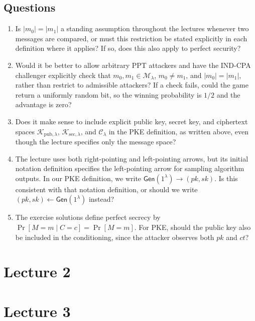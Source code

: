 \documentclass[12pt,a4paper]{article}
\begin{document}
\subsection*{Questions}
\begin{enumerate}
\item Is $|m_0|=|m_1|$ a standing assumption throughout the lectures
whenever two messages are compared, or must this restriction be stated
explicitly in each definition where it applies?
If so, does this also apply to perfect security?
\item Would it be better to allow arbitrary PPT attackers and have the
IND-CPA challenger explicitly check that $m_0,m_1\in\mathcal{M}_\lambda$,
$m_0\ne m_1$, and $|m_0|=|m_1|$, rather than restrict to admissible
attackers? If a check fails, could the game return a uniformly random
bit, so the winning probability is $1/2$ and the advantage is zero?
\item Does it make sense to include explicit public key, secret key,
and ciphertext spaces
$\mathcal{K}_{\mathrm{pub},\lambda}$,
$\mathcal{K}_{\mathrm{sec},\lambda}$, and $\mathcal{C}_\lambda$
in the PKE definition, as written above, even though the lecture
specifies only the message space?
\item The lecture uses both right-pointing and left-pointing arrows,
but its initial notation definition specifies the left-pointing arrow
for sampling algorithm outputs. In our PKE definition, we write
$\mathsf{Gen}(1^\lambda)\longrightarrow(pk,sk)$.
Is this consistent with that notation definition, or should we write
$(pk,sk)\leftarrow\mathsf{Gen}(1^\lambda)$ instead?
\item The exercise solutions define perfect secrecy by
$\Pr[M=m\mid C=c]=\Pr[M=m]$.
For PKE, should the public key also be included in the conditioning,
since the attacker observes both $pk$ and $ct$?
\end{enumerate}

\section{Lecture 2}

\clearpage
\section{Lecture 3}
\end{document}
